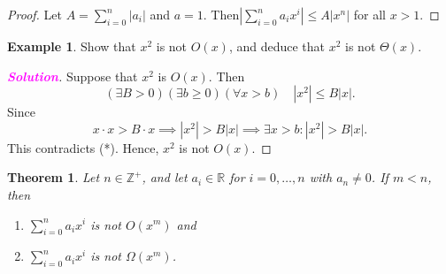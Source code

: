 \documentclass[12pt,openany]{book}
\newtheorem{theorem}{Theorem}[chapter]
\theoremstyle{definition}
\newtheorem{example}{Example}[chapter]
\newcommand{\Z}{\mathbb{Z}}
\newcommand{\R}{\mathbb{R}}
\renewcommand{\abs}[1]{\left\lvert #1 \right\rvert}
\newcommand{\sol}{\textcolor{magenta}{\bf Solution}}
\begin{document}
	\begin{proof}
		Let $A=\sum_{i=0}^n|a_i|$ and $a=1$. Then$\abs{\sum_{i=0}^na_ix^i}\leq A|x^n|$ for all $x>1$.
	\end{proof}
	\vspace{10pt}
	\begin{example}
		Show that $x^2$ is not $O(x)$, and deduce that $x^2$ is not $\Theta(x)$.
		\begin{proof}[\sol]
			Suppose that $x^2$ is $O(x)$. Then \begin{equation}\tag{*}
				(\exists B>0)(\exists b\geq 0)(\forall x>b)\quad|x^2|\leq B|x|.
			\end{equation} Since \[
			x\cdot x> B\cdot x\implies |x^2|> B|x|\implies\exists x>b:|x^2|> B|x|.
			\] This contradicts (*). Hence, $x^2$ is not $O(x)$.
		\end{proof}
	\end{example}
	\vspace{10pt}
	\begin{tcolorbox}[colframe=thmcolor,title={\color{white}\bf Limitation on Orders of Polynomial Functions}]
		\begin{theorem}
			Let $n\in\Z^+$, and let $a_i\in\R$ for $i=0,\dots,n$ with $a_n\neq 0$. If $m<n$, then \begin{enumerate}[(1)]
				\item $\sum_{i=0}^na_ix^i$ is not $O(x^m)$ and
				\item $\sum_{i=0}^na_ix^i$ is not $\Omega(x^m)$.
			\end{enumerate}
		\end{theorem}
	\end{tcolorbox}

	\newpage
\end{document}
